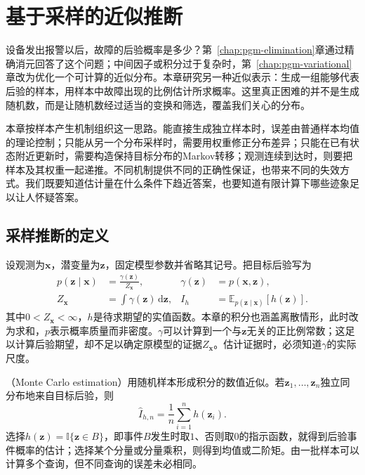 \chapter{基于采样的近似推断}
\label{chap:pgm-sampling}

设备发出报警以后，故障的后验概率是多少？第~\ref{chap:pgm-elimination}章通过精确消元回答了这个问题；中间因子或积分过于复杂时，第~\ref{chap:pgm-variational}章改为优化一个可计算的近似分布。本章研究另一种近似表示：生成一组能够代表后验的样本，用样本中故障出现的比例估计所求概率。这里真正困难的并不是生成随机数，而是让随机数经过适当的变换和筛选，覆盖我们关心的分布。

本章按样本产生机制组织这一思路。能直接生成独立样本时，误差由普通样本均值的理论控制；只能从另一个分布采样时，需要用权重修正分布差异；只能在已有状态附近更新时，需要构造保持目标分布的Markov转移；观测连续到达时，则要把样本及其权重一起递推。不同机制提供不同的正确性保证，也带来不同的失效方式。我们既要知道估计量在什么条件下趋近答案，也要知道有限计算下哪些迹象足以让人怀疑答案。

\section{采样推断的定义}
\label{sec:pgm-sampling-definition}

设观测为$\bm{x}$，潜变量为$\bm{z}$，固定模型参数并省略其记号。把目标后验写为
\begin{equation}
  \begin{aligned}
    p(\bm{z}\mid\bm{x})&=\frac{\gamma(\bm{z})}{Z_{\bm{x}}},&
    \gamma(\bm{z})&=p(\bm{x},\bm{z}),\\
    Z_{\bm{x}}&=\int\gamma(\bm{z})\,\mathrm{d}\bm{z},&
    I_h&=\mathbb{E}_{p(\bm{z}\mid\bm{x})}[h(\bm{z})].
  \end{aligned}
  \label{eq:pgm-sampling-target}
\end{equation}
其中$0<Z_{\bm{x}}<\infty$，$h$是待求期望的实值函数。本章的积分也涵盖离散情形，此时改为求和，$p$表示概率质量而非密度。$\gamma$可以计算到一个与$\bm{z}$无关的正比例常数；这足以计算后验期望，却不足以确定原模型的证据$Z_{\bm{x}}$。估计证据时，必须知道$\gamma$的实际尺度。

（Monte Carlo estimation）用随机样本形成积分的数值近似。若$\bm{z}_1,\ldots,\bm{z}_n$独立同分布地来自目标后验，则
\begin{equation}
  \widehat I_{h,n}=\frac{1}{n}\sum_{i=1}^{n}h(\bm{z}_i).
  \label{eq:pgm-sampling-direct-estimator}
\end{equation}
选择$h(\bm{z})=\mathbb{I}\{\bm{z}\in B\}$，即事件$B$发生时取$1$、否则取$0$的指示函数，就得到后验事件概率的估计；选择某个分量或分量乘积，则得到均值或二阶矩。由一批样本可以计算多个查询，但不同查询的误差未必相同。

